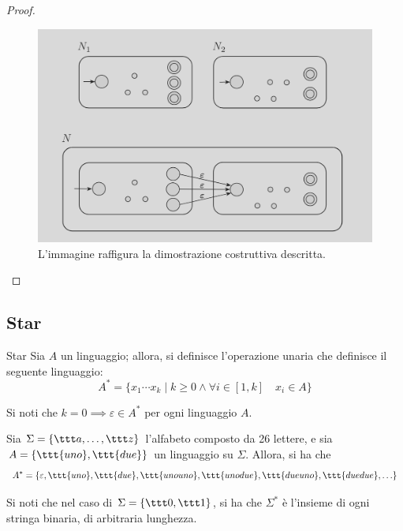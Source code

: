 \documentclass[a4paper, 12pt]{report}
\begin{document}
\begin{proof}
        \begin{figure}[H]
            \centering
            \includegraphics[scale=0.35]{../assets/concat-neg.png}
            \caption{L'immagine raffigura la dimostrazione costruttiva descritta.}
        \end{figure}
    \end{proof}

    \subsection{Star}

    \begin{frameddefn}{Star}
        Sia $A$ un linguaggio; allora, si definisce l'operazione unaria  che definisce il seguente linguaggio: $$A^* = \{x_1 \cdots x_k \mid k \ge 0 \land \forall i \in [1, k] \quad x_i \in A\}$$

        Si noti che $k = 0 \implies \varepsilon \in A^*$ per ogni linguaggio $A$.
    \end{frameddefn}

    \begin{example}[Star]
        Sia $\Sigma = \{\ttt a , \ldots, \ttt z\}$ l'alfabeto composto da 26 lettere, e sia $A = \{\ttt{uno}, \ttt{due}\}$ un linguaggio su $\Sigma$. Allora, si ha che $$A^* = \{\varepsilon, \ttt{uno}, \ttt{due}, \ttt{unouno}, \ttt{unodue}, \ttt{dueuno}, \ttt{duedue}, \ldots\}$$
    \end{example}
   
    \begin{example}
        Si noti che nel caso di $\Sigma = \{ \ttt 0, \ttt 1 \}$, si ha che $\Sigma^*$ è l'insieme di ogni stringa binaria, di arbitraria lunghezza.
    \end{example}
\end{document}
